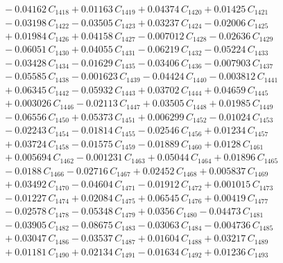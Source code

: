 \documentclass[a4paper,11pt]{article}
\begin{document}
\begin{align}
&\quad - 0.04162\,C_{1418} + 0.01163\,C_{1419} + 0.04374\,C_{1420} + 0.01425\,C_{1421} \nonumber\\
&\quad - 0.03198\,C_{1422} - 0.03505\,C_{1423} + 0.03237\,C_{1424} - 0.02006\,C_{1425} \nonumber\\
&\quad + 0.01984\,C_{1426} + 0.04158\,C_{1427} - 0.007012\,C_{1428} - 0.02636\,C_{1429} \nonumber\\
&\quad - 0.06051\,C_{1430} + 0.04055\,C_{1431} - 0.06219\,C_{1432} - 0.05224\,C_{1433} \nonumber\\
&\quad - 0.03428\,C_{1434} - 0.01629\,C_{1435} - 0.03406\,C_{1436} - 0.007903\,C_{1437} \nonumber\\
&\quad - 0.05585\,C_{1438} - 0.001623\,C_{1439} - 0.04424\,C_{1440} - 0.003812\,C_{1441} \nonumber\\
&\quad + 0.06345\,C_{1442} - 0.05932\,C_{1443} + 0.03702\,C_{1444} + 0.04659\,C_{1445} \nonumber\\
&\quad + 0.003026\,C_{1446} - 0.02113\,C_{1447} + 0.03505\,C_{1448} + 0.01985\,C_{1449} \nonumber\\
&\quad - 0.06556\,C_{1450} + 0.05373\,C_{1451} + 0.006299\,C_{1452} - 0.01024\,C_{1453} \nonumber\\
&\quad - 0.02243\,C_{1454} - 0.01814\,C_{1455} - 0.02546\,C_{1456} + 0.01234\,C_{1457} \nonumber\\
&\quad + 0.03724\,C_{1458} - 0.01575\,C_{1459} - 0.01889\,C_{1460} + 0.0128\,C_{1461} \nonumber\\
&\quad + 0.005694\,C_{1462} - 0.001231\,C_{1463} + 0.05044\,C_{1464} + 0.01896\,C_{1465} \nonumber\\
&\quad - 0.0188\,C_{1466} - 0.02716\,C_{1467} + 0.02452\,C_{1468} + 0.005837\,C_{1469} \nonumber\\
&\quad + 0.03492\,C_{1470} - 0.04604\,C_{1471} - 0.01912\,C_{1472} + 0.001015\,C_{1473} \nonumber\\
&\quad - 0.01227\,C_{1474} + 0.02084\,C_{1475} + 0.06545\,C_{1476} + 0.00419\,C_{1477} \nonumber\\
&\quad - 0.02578\,C_{1478} - 0.05348\,C_{1479} + 0.0356\,C_{1480} - 0.04473\,C_{1481} \nonumber\\
&\quad - 0.03905\,C_{1482} - 0.08675\,C_{1483} - 0.03063\,C_{1484} - 0.004736\,C_{1485} \nonumber\\
&\quad + 0.03047\,C_{1486} - 0.03537\,C_{1487} + 0.01604\,C_{1488} + 0.03217\,C_{1489} \nonumber\\
&\quad + 0.01181\,C_{1490} + 0.02134\,C_{1491} - 0.01634\,C_{1492} + 0.01236\,C_{1493} \nonumber\\

\end{align}
\end{document}
